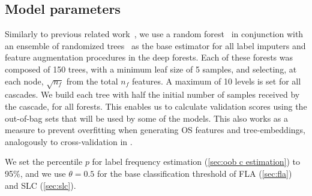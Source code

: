 \documentclass[conference,compsoc]{IEEEtran}
\begin{document}
% 
% 

\subsection{Model parameters}

Similarly to previous related work~\cite{zhou2019deep,wang2020learning,nakano2022deep}, we use a random forest~\cite{breiman2001random} in conjunction with an ensemble of randomized trees~\cite{geurts2006extremely} as the base estimator for all label imputers and feature augmentation procedures in the deep forests.
Each of these forests was composed of 150 trees, with a minimum leaf size of 5 samples, and selecting, at each node, $\sqrt{n_f}$ from the total $n_f$ features. A maximum of 10 levels is set for all cascades.
%
We build each tree with half the initial number of samples received by the cascade, for all forests.
This enables us to calculate validation scores using the out-of-bag sets that will be used by some of the models. This also works as a measure to prevent overfitting when generating OS features and tree-embeddings, analogously to cross-validation in \cite{zhou2019deep,nakano2022deep}.

We set the percentile $p$ for label frequency estimation (\autoref{sec:oob c estimation}) to 95\%, and we use $\theta=0.5$ for the base classification threshold of FLA (\autoref{sec:fla}) and SLC (\autoref{sec:slc}).
\end{document}
